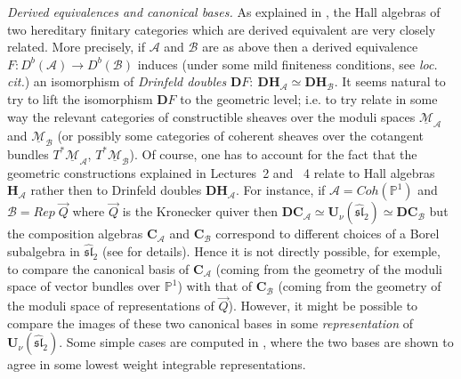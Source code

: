 \documentclass[a4paper,10pt]{amsart}
\def\U{\mathbf{U}}
\def\A{\mathcal{A}}
\numberwithin{equation}{section}
\begin{document}
\noindent
\textit{Derived equivalences and canonical bases.} As explained in \cite[Lecture~5]{Trieste}, the Hall algebras of two hereditary finitary categories which are derived equivalent are very closely related. More precisely, if $\mathcal{A}$ and $\mathcal{B}$ are as above then a derived equivalence $F: D^b(\mathcal{A}) \to D^b(\mathcal{B})$ induces (under some mild finiteness conditions, see \textit{loc. cit.}) an isomorphism of \textit{Drinfeld doubles} $\mathbf{D}F:~\mathbf{DH}_{\mathcal{A}} \simeq \mathbf{DH}_{\mathcal{B}}$. It seems natural to try to lift the isomorphism $\mathbf{D}F$ to the geometric level; i.e. to try relate in some way the relevant categories of constructible sheaves over the moduli spaces $\underline{\mathcal{M}}_{\mathcal{A}}$ 
and $\underline{\mathcal{M}}_{\mathcal{B}}$ (or possibly some categories of coherent sheaves over the cotangent bundles $T^*\underline{\mathcal{M}}_{\mathcal{A}}$, $T^*\underline{\mathcal{M}}_{\mathcal{B}}$).
Of course, one has to account for the fact that the geometric constructions explained in Lectures~2 and ~4 relate to Hall algebras $\mathbf{H}_{\mathcal{A}}$ rather then to Drinfeld doubles $\mathbf{DH}_{\A}$. For instance, if $\A=Coh(\mathbb{P}^1)$ and $\mathcal{B}=Rep\;\vec{Q}$ where $\vec{Q}$ is the Kronecker quiver then $\mathbf{DC}_{\mathcal{A}} \simeq \U_\nu(\widehat{\mathfrak{sl}}_2) \simeq \mathbf{DC}_{\mathcal{B}}$ but the composition algebras $\mathbf{C}_{\mathcal{A}}$ and $\mathbf{C}_{\mathcal{B}}$ correspond to different choices of a Borel subalgebra in $\widehat{\mathfrak{sl}}_2$ (see \cite[Lecture~5]{Trieste} for details). Hence it is not directly possible, for exemple, to compare the canonical basis of $\mathbf{C}_{\mathcal{A}}$ (coming from the geometry of the moduli space of vector bundles over $\mathbb{P}^1$) with that of $\mathbf{C}_{\mathcal{B}}$ (coming from the geometry of the moduli space of representations of $\vec{Q}$). However, it might be possible to compare the images of these two canonical bases in some \textit{representation} of $\U_\nu(\widehat{\mathfrak{sl}}_2)$. Some simple cases are computed in \cite[Section~11]{SInvent}, where the two bases are shown to agree in some lowest weight integrable representations.

\vspace{.2in}
\end{document}
